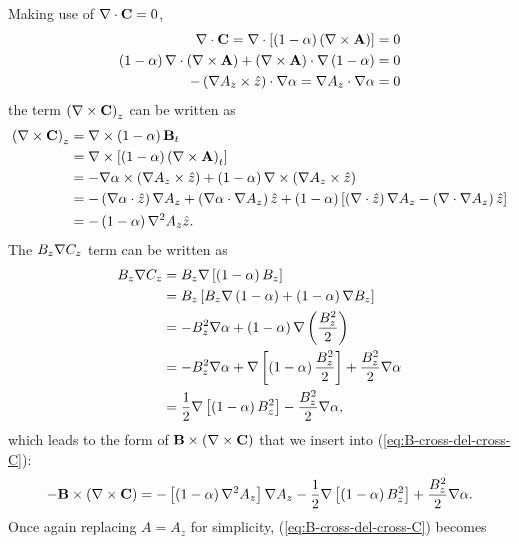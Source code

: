 Making use of $\nabla \cdot\mathbf{C}=0$,
\[\begin{split}
    \nabla \cdot\mathbf{C} = \nabla \cdot\left[ \left( 1-\alpha \right)\left( \nabla \times\mathbf{A} \right) \right] &= 0 \\
    \left( 1-\alpha \right)\nabla \cdot \left( \nabla \times\mathbf{A} \right) + \left( \nabla \times\mathbf{A} \right)\cdot\nabla\left( 1-\alpha \right) &= 0 \\
    -\left( \nabla A_z\times\hat{z} \right)\cdot\nabla{\alpha} = \nabla A_z \cdot\nabla\alpha &= 0 \\
\end{split}\]
the term $\left( \nabla \times\mathbf{C} \right)_z$ can be written as
\[\begin{split}
    \left( \nabla \times\mathbf{C} \right)_z &= \nabla \times\left( 1-\alpha \right)\mathbf{B}_t \\
    &= \nabla \times\left[ \left( 1-\alpha \right)\left( \nabla \times\mathbf{A} \right)_t \right] \\
    &= -\nabla\alpha\times\left( \nabla A_z\times\hat{z} \right) + \left( 1-\alpha \right)\nabla \times \left( \nabla A_z\times\hat{z} \right) \\
    &= -\left( \nabla\alpha\cdot\hat{z} \right)\nabla A_z + \left( \nabla\alpha\cdot\nabla A_z \right)\hat{z} + \left( 1-\alpha \right)\left[ \left( \nabla \cdot\hat{z} \right)\nabla A_z - \left( \nabla \cdot\nabla A_z \right)\hat{z} \right] \\
    &= -\left( 1-\alpha \right)\nabla^2 A_z\hat{z}. \\
\end{split}\]
The $B_z\nabla C_z$ term can be written as
\[\begin{split}
    B_z\nabla C_z &= B_z\nabla\left[ \left( 1-\alpha \right)B_z \right] \\
    &= B_z\left[ B_z\nabla\left( 1-\alpha \right) + \left( 1-\alpha \right)\nabla B_z \right] \\
    &= -B_z^2\nabla\alpha + \left( 1-\alpha \right)\nabla\left( \frac{B_z^2}{2} \right) \\
    &= -B_z^2\nabla\alpha + \nabla\left[ \left( 1-\alpha \right)\frac{B_z^2}{2} \right] + \frac{B_z^2}{2}\nabla\alpha \\
    &= \frac{1}{2}\nabla\left[ \left( 1-\alpha \right)B_z^2 \right] - \frac{B_z^2}{2}\nabla\alpha,
\end{split}\]
which leads to the form of $\mathbf{B}\times\left( \nabla \times\mathbf{C} \right)$ that we insert into (\ref{eq:B-cross-del-cross-C}):
\begin{equation}
    -\mathbf{B}\times\left( \nabla \times\mathbf{C} \right) = -\left[ \left( 1-\alpha \right)\nabla^2 A_z \right] \nabla A_z - \frac{1}{2}\nabla\left[ \left( 1-\alpha \right)B_z^2 \right] + \frac{B_z^2}{2}\nabla\alpha.
    \label{eq:triple-cross-product}
\end{equation}
Once again replacing $A=A_z$ for simplicity, (\ref{eq:B-cross-del-cross-C}) becomes
